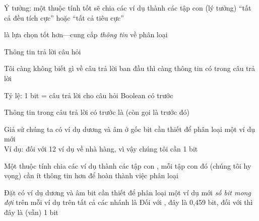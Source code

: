 \documentclass{article}
\begin{document}
\begin{huge}




Ý tưởng: một thuộc tính tốt sẽ chia các ví dụ thành các tập con
(lý tưởng) ``tất cả đều tích cực'' hoặc ``tất cả tiêu cực''

\vspace*{0.5in}

\textwidth
{}

 là lựa chọn tốt hơn---cung cấp \emph{thông tin} về phân loại




Thông tin trả lời câu hỏi

Tôi càng không biết gì về câu trả lời ban đầu thì càng
thông tin có trong câu trả lời

Tỷ lệ: 1 bit = câu trả lời cho câu hỏi Boolean có  trước

Thông tin trong câu trả lời có trước  là
\mat{\[
  H(\<P_1,\ldots,P_n\>) = \mysum_{i\eq 1}^n - P_i \log_2 P_i
\]}
(còn gọi là  trước đó)




Giả sử chúng ta có  ví dụ dương và  âm ở gốc\nl
\mat{$\implies$}  bit cần thiết để phân loại một ví dụ mới \\
Ví dụ: đối với 12 ví dụ về nhà hàng,  vì vậy chúng tôi cần 1 bit

Một thuộc tính chia các ví dụ  thành các tập con , mỗi tập con đó
(chúng tôi hy vọng) cần ít thông tin hơn để hoàn thành việc phân loại

Đặt  có  ví dụ dương và  âm \al
\mat{$\implies$}  bit cần thiết để phân loại một ví dụ mới \al
\mat{$\implies$} \emph{số bit mong đợi} trên mỗi ví dụ trên tất cả các nhánh là
Đối với , đây là 0,459 bit, đối với  thì đây là (vẫn) 1 bit


\end{huge}
\end{document}
